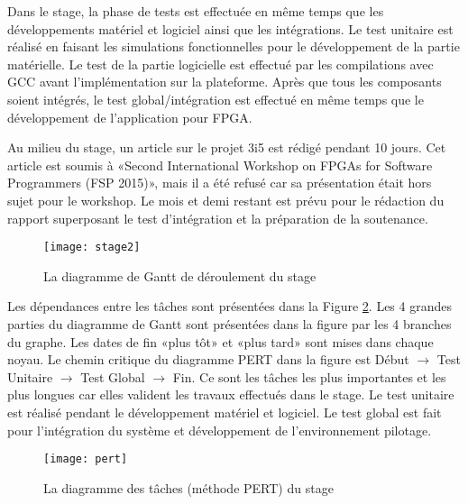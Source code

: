 Dans le stage, la phase de tests est effectuée en même temps que les développements matériel et logiciel ainsi que les intégrations.
Le test unitaire est réalisé en faisant les simulations fonctionnelles pour le développement de la partie matérielle.
Le test de la partie logicielle est effectué par les compilations avec \gls{GCC} avant l'implémentation sur la plateforme.
Après que tous les composants soient intégrés,
le test global/intégration est effectué en même temps que le développement de l'application pour FPGA. 

Au milieu du stage, un article sur le projet 3i5\cite{Wicaksana2015} est rédigé pendant 10 jours. Cet article est soumis
à «Second International Workshop on FPGAs for Software Programmers (FSP 2015)», 
mais il a été refusé car sa présentation était hors sujet pour le workshop.
Le mois et demi restant est prévu pour le rédaction du rapport superposant le test d'intégration et la préparation
de la soutenance.

\begin{figure}[h]
	\centering
	\texttt{[image: stage2]}
	\caption{La diagramme de Gantt de déroulement du stage}
	\label{fig:gantt}
	\vspace{-2mm}
\end{figure}

Les dépendances entre les tâches sont présentées dans la Figure \ref{fig:pert}. 
Les 4 grandes parties du diagramme de Gantt sont présentées dans la figure par les 4 branches du graphe.
Les dates de fin «plus tôt» et «plus tard» sont mises dans chaque noyau. Le chemin critique du diagramme PERT
dans la figure est Début $\rightarrow$ Test Unitaire $\rightarrow$ Test Global $\rightarrow$ Fin. Ce sont les tâches les plus importantes et les plus longues car
elles valident les travaux effectués dans le stage. 
Le test unitaire est réalisé pendant le développement matériel et logiciel. Le test global est fait pour l'intégration
du système et développement de l'environnement pilotage.

\begin{figure}[h]
	\centering
	\texttt{[image: pert]}
	\caption{La diagramme des tâches (méthode PERT) du stage}
	\label{fig:pert}
	\vspace{-2mm}
\end{figure}


